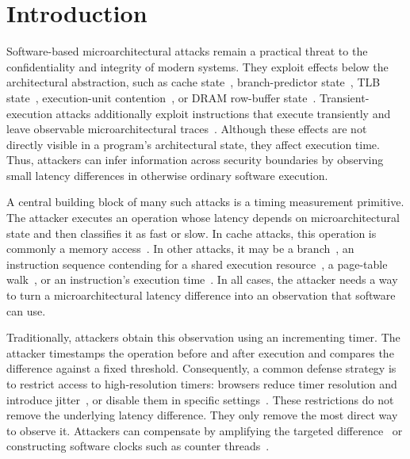 \documentclass[letterpaper,twocolumn,10pt]{article} %
\begin{document}
\section{Introduction}
Software-based microarchitectural attacks remain a practical threat to the confidentiality and integrity of modern systems.
They exploit effects below the architectural abstraction, such as cache state~\cite{Osvik2006,Yarom2014Flush}, branch-predictor state~\cite{Evtyushkin2018,Lee2017Inferring}, TLB state~\cite{Gras2018,Lipp2022Prefetch}, execution-unit contention~\cite{aldaya2019port,Rokicki2022port}, or DRAM row-buffer state~\cite{Pessl2016}.
Transient-execution attacks additionally exploit instructions that execute transiently and leave observable microarchitectural traces~\cite{Kocher2019,Lipp2018meltdown,Canella2019A}.
Although these effects are not directly visible in a program's architectural state, they affect execution time.
Thus, attackers can infer information across security boundaries by observing small latency differences in otherwise ordinary software execution.

A central building block of many such attacks is a timing measurement primitive.
The attacker executes an operation whose latency depends on microarchitectural state and then classifies it as fast or slow.
In cache attacks, this operation is commonly a memory access~\cite{Yarom2014Flush,Gruss2016Flush,Rauscher2025Systematic}.
In other attacks, it may be a branch~\cite{Aciicmez2007predicting,Lee2017Inferring,Evtyushkin2018}, an instruction sequence contending for a shared execution resource~\cite{aldaya2019port,Hornetz2025PortPrint}, a page-table walk~\cite{Gruss2016Prefetch,Lipp2022Prefetch}, or an instruction's execution time~\cite{Andrysco2015subnormal}.
In all cases, the attacker needs a way to turn a microarchitectural latency difference into an observation that software can use.

Traditionally, attackers obtain this observation using an incrementing timer.
The attacker timestamps the operation before and after execution and compares the difference against a fixed threshold.
Consequently, a common defense strategy is to restrict access to high-resolution timers: browsers reduce timer resolution and introduce jitter~\cite{Schwarz2017Timers,VanGoethem2015,Shusterman2021prime}, or disable them in specific settings~\cite{Intel2021sgxdeveloper,Lipp2016,thomas2026riscy}.
These restrictions do not remove the underlying latency difference.
They only remove the most direct way to observe it.
Attackers can compensate by amplifying the targeted difference~\cite{Allan2016,Roettger2021SpectreJS,Schwarzl2021dynamic,Purnal2023showtime} or constructing software clocks such as counter threads~\cite{Schwarz2017Timers,Lipp2016,Gras2017aslr}.
\end{document}
